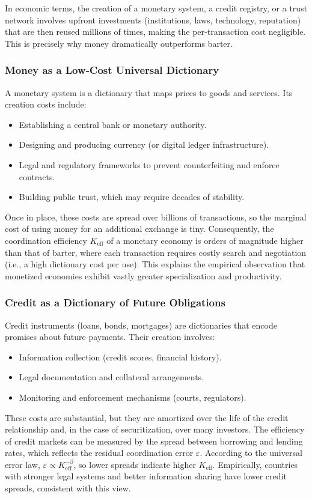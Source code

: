 \documentclass[11pt,a4paper]{article}
\newcommand{\Keff}{K_{\mathrm{eff}}}
\theoremstyle{remark}
\begin{document}
	In economic terms, the creation of a monetary system, a credit registry, or a trust network involves upfront investments (institutions, laws, technology, reputation) that are then reused millions of times, making the per‑transaction cost negligible. This is precisely why money dramatically outperforms barter.
	
	\subsubsection{Money as a Low‑Cost Universal Dictionary}
	A monetary system is a dictionary that maps prices to goods and services. Its creation costs include:
	\begin{itemize}
		\item Establishing a central bank or monetary authority.
		\item Designing and producing currency (or digital ledger infrastructure).
		\item Legal and regulatory frameworks to prevent counterfeiting and enforce contracts.
		\item Building public trust, which may require decades of stability.
	\end{itemize}
	Once in place, these costs are spread over billions of transactions, so the marginal cost of using money for an additional exchange is tiny. Consequently, the coordination efficiency \(\Keff\) of a monetary economy is orders of magnitude higher than that of barter, where each transaction requires costly search and negotiation (i.e., a high dictionary cost per use). This explains the empirical observation that monetized economies exhibit vastly greater specialization and productivity.
	
	\subsubsection{Credit as a Dictionary of Future Obligations}
	Credit instruments (loans, bonds, mortgages) are dictionaries that encode promises about future payments. Their creation involves:
	\begin{itemize}
		\item Information collection (credit scores, financial history).
		\item Legal documentation and collateral arrangements.
		\item Monitoring and enforcement mechanisms (courts, regulators).
	\end{itemize}
	These costs are substantial, but they are amortized over the life of the credit relationship and, in the case of securitization, over many investors. The efficiency of credit markets can be measured by the spread between borrowing and lending rates, which reflects the residual coordination error \(\varepsilon\). According to the universal error law, \(\varepsilon \propto \Keff^{-\beta}\), so lower spreads indicate higher \(\Keff\). Empirically, countries with stronger legal systems and better information sharing have lower credit spreads, consistent with this view.
	
\end{document}
